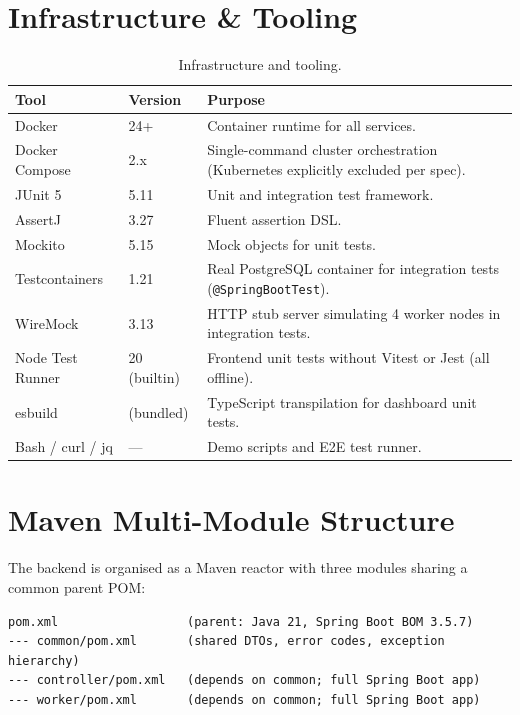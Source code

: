 \documentclass[12pt,a4paper]{report}
\begin{document}
\section{Infrastructure \& Tooling}

\begin{table}[H]
  \centering
  \caption{Infrastructure and tooling.}
  \label{tab:infra-stack}
  \begin{tabularx}{\textwidth}{llX}
    \toprule
    \textbf{Tool}         & \textbf{Version} & \textbf{Purpose} \\
    \midrule
    Docker                & 24+     & Container runtime for all services. \\
    Docker Compose        & 2.x     & Single-command cluster orchestration (Kubernetes explicitly excluded per spec). \\
    JUnit 5               & 5.11    & Unit and integration test framework. \\
    AssertJ               & 3.27    & Fluent assertion DSL. \\
    Mockito               & 5.15    & Mock objects for unit tests. \\
    Testcontainers        & 1.21    & Real PostgreSQL container for integration tests (\texttt{@SpringBootTest}). \\
    WireMock              & 3.13    & HTTP stub server simulating 4 worker nodes in integration tests. \\
    Node Test Runner      & 20 (builtin) & Frontend unit tests without Vitest or Jest (all offline). \\
    esbuild               & (bundled) & TypeScript transpilation for dashboard unit tests. \\
    Bash / curl / jq      & ---       & Demo scripts and E2E test runner. \\
    \bottomrule
  \end{tabularx}
\end{table}

\section{Maven Multi-Module Structure}

The backend is organised as a Maven reactor with three modules sharing a common parent POM:

\begin{lstlisting}[style=bashStyle,caption=Maven module layout]
pom.xml                  (parent: Java 21, Spring Boot BOM 3.5.7)
--- common/pom.xml       (shared DTOs, error codes, exception hierarchy)
--- controller/pom.xml   (depends on common; full Spring Boot app)
--- worker/pom.xml       (depends on common; full Spring Boot app)
\end{lstlisting}
\end{document}

